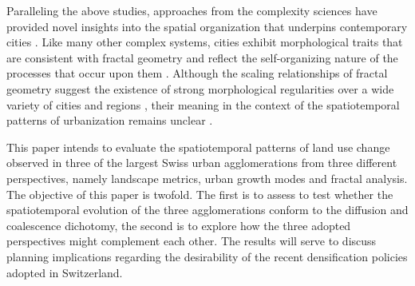 \documentclass[10pt,letterpaper]{article}
\begin{document}
Paralleling the above studies, approaches from the complexity sciences have provided novel insights into the spatial organization that underpins contemporary cities \cite{batty2005cities}.
Like many other complex systems, cities exhibit morphological traits that are consistent with fractal geometry and reflect the self-organizing nature of the processes that occur upon them \cite{white1993cellular}.
Although the scaling relationships of fractal geometry suggest the existence of strong morphological regularities over a wide variety of cities and regions \cite{frankhauser1994fractalite, batty1994fractal, white2015modeling}, %
their meaning in the context of the spatiotemporal patterns of urbanization remains unclear \cite{li2000fractal, manson2006complexity, bosch2019addressing}.


This paper intends to evaluate the spatiotemporal patterns of land use change observed in three of the largest Swiss urban agglomerations from three different perspectives, namely landscape metrics, urban growth modes and fractal analysis. 
The objective of this paper is twofold.
The first is to assess to test whether the spatiotemporal evolution of the three agglomerations conform to the diffusion and coalescence dichotomy, the second is to explore how the three adopted perspectives might complement each other.
The results will serve to discuss planning implications regarding the desirability of the recent densification policies adopted in Switzerland.
\end{document}
